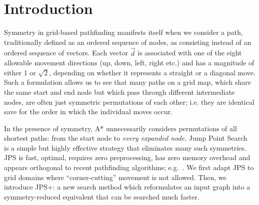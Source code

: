 \section{Introduction}
\label{sec:introduction}

Symmetry in grid-based pathfinding manifests itself when we consider a
path, traditionally defined as an ordered sequence of nodes, as consisting
instead of an ordered sequence of vectors.
Each vector $\vec{d}$ is associated with 
one of the eight allowable movement directions (up, down, left, right etc.)
and has a magnitude of either 1 or $\sqrt 2$, depending on whether 
it represents a straight or a diagonal move.
Such a formulation allows us to see that 
many paths on a grid map, which share the same start and end node but which pass through 
different intermediate nodes, are often just symmetric permutations of each other; i.e.
they are identical save for the order in which the individual moves occur.

In the presence of symmetry, A* unnecessarily considers permutations 
of all shortest paths: from the start node to 
\emph{every expanded node}.
Jump Point Search~\cite{harabor11b} is a simple but highly effective strategy that
eliminates many such symmetries. 
JPS is fast, optimal, requires zero preprocessing, has zero memory overhead
and appears orthogonal to recent pathfinding algorithms; e.g.~\cite{bjornsson06,pochter10,goldenberg10}. 
We first adapt JPS to grid domains where ``corner-cutting'' movement is not allowed. 
Then, we introduce JPS+: a new search method which reformulates an input graph into a 
symmetry-reduced equivalent that can be 
searched much faster.
